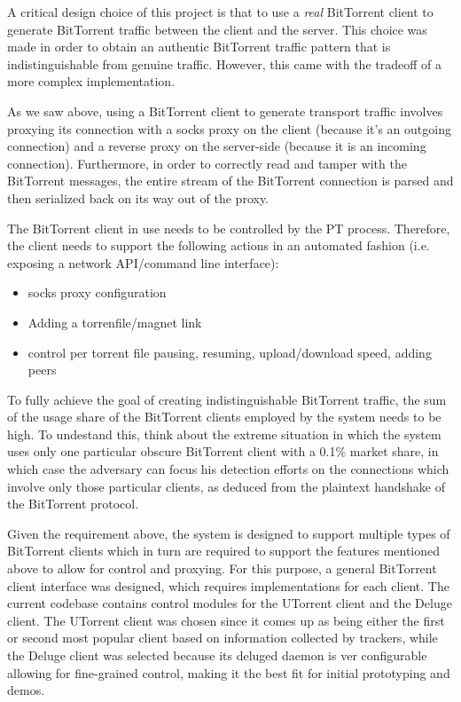 \documentclass[11pt]{book} %
\begin{document}
A critical design choice of this project is that to use a \textit{real} BitTorrent client to generate BitTorrent traffic between the client and the server. This choice was made in order to obtain an authentic BitTorrent traffic pattern that is indistinguishable from genuine traffic. However, this came with the tradeoff of a more complex implementation.

As we saw above, using a BitTorrent client to generate transport traffic involves proxying its connection with a socks proxy on the client (because it's an outgoing connection) and a reverse proxy on the server-side (because it is an incoming connection). Furthermore, in order to correctly read and tamper with the BitTorrent messages, the entire stream of the BitTorrent connection is parsed and then serialized back on its way out of the proxy. 

 The BitTorrent client in use needs to be controlled by the PT process. Therefore, the client needs to support the following actions in an automated fashion (i.e. exposing a network API/command line interface):

\begin{itemize}
\item socks proxy configuration
\item Adding a torrenfile/magnet link
\item control per torrent file pausing, resuming, upload/download speed, adding peers
\end{itemize}

To fully achieve the goal of creating indistinguishable BitTorrent traffic, the sum of the usage share of the BitTorrent clients employed by the system needs to be high. To undestand this, think about the extreme situation in which the system uses only one particular obscure BitTorrent client with a 0.1\% market share, in which case the adversary can focus his detection efforts on the connections which involve only those particular clients, as deduced from the plaintext handshake of the BitTorrent protocol.

Given the requirement above, the system is designed to support multiple types of BitTorrent clients which in turn are required to support the features mentioned above to allow for control and proxying. For this purpose, a general BitTorrent client interface was designed, which requires implementations for each client. The current codebase contains control modules for the UTorrent client and the Deluge client. The UTorrent client  was chosen since it comes up as being either the first or second most popular client based on information collected by trackers, while the Deluge client was selected because its deluged daemon is ver configurable allowing for fine-grained control, making it the best fit for initial prototyping and demos. 
\end{document}

